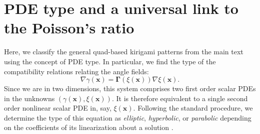 \documentclass[aps,11pt,tightenlines,notitlepage,superscriptaddress,longbibliography,nofootinbib]{revtex4-1}
\begin{document}


\section{PDE type and a universal link to the Poisson's ratio}\label{s:PDEClass}

Here, we classify the general quad-based kirigami patterns from the main text using the concept of PDE type. In particular, we find the type of the compatibility relations relating the angle fields:
\begin{equation}\label{eq:forPDEType}
\nabla \gamma(\mathbf{x}) = \boldsymbol{\Gamma}(\xi(\mathbf{x})) \nabla \xi(\mathbf{x}).  
\end{equation}
Since we are in two dimensions, this system comprises two first order scalar PDEs in the unknowns $(\gamma(\mathbf{x}),\xi(\mathbf{x}))$. It is therefore equivalent to a single second order nonlinear scalar PDE in, say, $\xi(\mathbf{x})$. Following the standard procedure, we determine the type of this equation as \textit{elliptic}, \textit{hyperbolic}, or \textit{parabolic} depending on the coefficients of its linearization about a solution \cite[Ch.\;III; Sec.]{courant2008methods}. 
\end{document}
